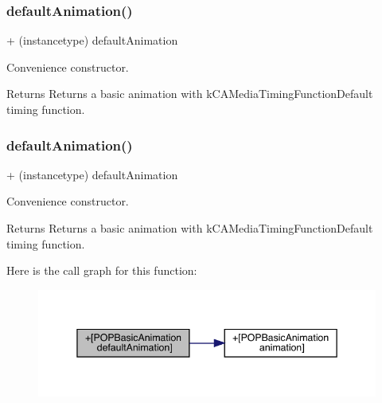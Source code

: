 \subsubsection{\texorpdfstring{default\+Animation()}{defaultAnimation()}\hspace{0.1cm}{\footnotesize\ttfamily [2/3]}}
{\footnotesize\ttfamily + (instancetype) default\+Animation \begin{DoxyParamCaption}{ }\end{DoxyParamCaption}}

Convenience constructor. \begin{DoxyReturn}{Returns}
Returns a basic animation with k\+C\+A\+Media\+Timing\+Function\+Default timing function. 
\end{DoxyReturn}
\mbox{\label{interface_p_o_p_basic_animation_a93bf55b391828d3e76031be39bcdbd1f}} 
\subsubsection{\texorpdfstring{default\+Animation()}{defaultAnimation()}\hspace{0.1cm}{\footnotesize\ttfamily [3/3]}}
{\footnotesize\ttfamily + (instancetype) default\+Animation \begin{DoxyParamCaption}{ }\end{DoxyParamCaption}}

Convenience constructor. \begin{DoxyReturn}{Returns}
Returns a basic animation with k\+C\+A\+Media\+Timing\+Function\+Default timing function. 
\end{DoxyReturn}
Here is the call graph for this function\+:\nopagebreak
\begin{figure}[H]
\begin{center}
\leavevmode
\includegraphics[width=345pt]{interface_p_o_p_basic_animation_a93bf55b391828d3e76031be39bcdbd1f_cgraph}
\end{center}
\end{figure}
\mbox{\label{interface_p_o_p_basic_animation_a19baa1e60760e093db39511258f2a4fe}} 
